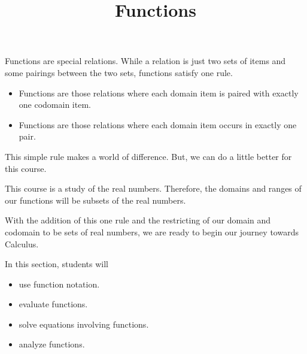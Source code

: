 \documentclass{ximera}
\title{Functions}
\begin{document}
\begin{abstract}
\end{abstract}
\maketitle




Functions are special relations. While a relation is just two sets of items and some pairings between the two sets, functions satisfy one rule. 

\begin{itemize}
\item Functions are those relations where each domain item is paired with exactly one codomain item.
\item Functions are those relations where each domain item occurs in exactly one pair.
\end{itemize}


This simple rule makes a world of difference. But, we can do a little better for this course.

This course is a study of the real numbers.  Therefore, the domains and ranges of our functions will be subsets of the real numbers.


With the addition of this one rule and the restricting of our domain and codomain to be sets of real numbers, we are ready to begin our journey towards Calculus.











\begin{sectionOutcomes}
In this section, students will 

\begin{itemize}
\item use function notation.
\item evaluate functions.
\item solve equations involving functions.
\item analyze functions.
\end{itemize}
\end{sectionOutcomes}
\end{document}
